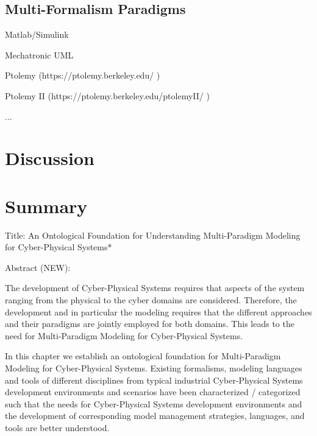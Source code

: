 \documentclass[a4paper,8pt]{article}
\begin{document}
\subsection{Multi-Formalism Paradigms}

Matlab/Simulink

Mechatronic UML

Ptolemy (https://ptolemy.berkeley.edu/ )

Ptolemy II (https://ptolemy.berkeley.edu/ptolemyII/ )

...


\section{Discussion}

\section{Summary}

\newpage 



\newpage

Title:
An Ontological Foundation for Understanding Multi-Paradigm Modeling for Cyber-Physical Systems*

Abstract (NEW):

The development of Cyber-Physical Systems requires that aspects of the system ranging from the physical to the cyber domains are considered. Therefore, the development and in particular the modeling requires that the different approaches and their paradigms are jointly employed for both domains. This leads to the need for Multi-Paradigm Modeling for Cyber-Physical Systems.

In this chapter we establish an ontological foundation for Multi-Paradigm Modeling for Cyber-Physical Systems. Existing formalisms, modeling languages and tools of different disciplines from typical industrial Cyber-Physical Systems development environments and scenarios have been characterized / categorized such that the needs for Cyber-Physical Systems development environments and the development of corresponding model management strategies, languages, and tools are better understood. 
\end{document}
